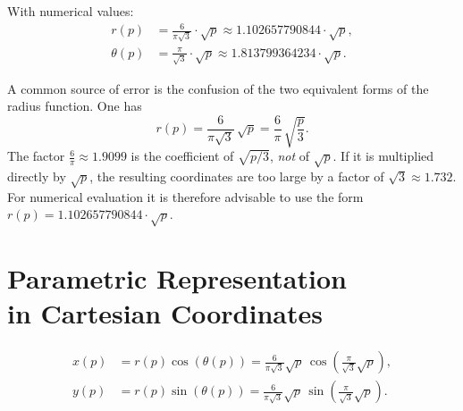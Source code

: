 With numerical values:
\begin{align}
r(p) &= \frac{6}{\pi\sqrt{3}} \cdot \sqrt{p} \approx 1.102657790844 \cdot \sqrt{p}, \\
\theta(p) &= \frac{\pi}{\sqrt{3}} \cdot \sqrt{p} \approx 1.813799364234 \cdot \sqrt{p}.
\end{align}

\begin{note}
A common source of error is the confusion of the two equivalent forms
of the radius function. One has
\[
  r(p) = \frac{6}{\pi\sqrt{3}}\,\sqrt{p}
       = \frac{6}{\pi}\,\sqrt{\frac{p}{3}}.
\]
The factor $\frac{6}{\pi} \approx 1.9099$ is the coefficient of $\sqrt{p/3}$, \emph{not} 
of $\sqrt{p}$. If it is multiplied directly by $\sqrt{p}$, the resulting 
coordinates are too large by a factor of $\sqrt{3} \approx 1.732$. 
For numerical evaluation it is therefore advisable to use the form 
$r(p) = 1.102657790844 \cdot \sqrt{p}$.
\end{note}

\section[Parametric Representation in Cartesian Coordinates]{Parametric Representation\texorpdfstring{\\}{ }in Cartesian Coordinates}

\begin{equation}
\begin{aligned}
x(p) &= r(p)\cos(\theta(p))
     = \frac{6}{\pi\sqrt{3}}\sqrt{p}\,
       \cos\!\left(\frac{\pi}{\sqrt{3}}\sqrt{p}\right), \\[6pt]
y(p) &= r(p)\sin(\theta(p))
     = \frac{6}{\pi\sqrt{3}}\sqrt{p}\,
       \sin\!\left(\frac{\pi}{\sqrt{3}}\sqrt{p}\right).
\end{aligned}
\end{equation}

